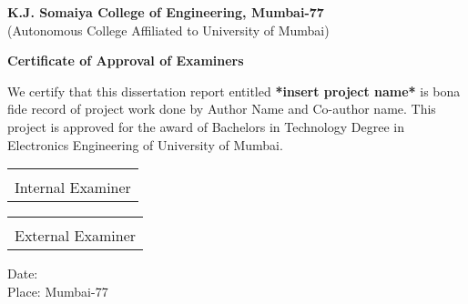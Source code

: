 \newpage
    \begin{center}
    
        \vspace*{0.1cm}
        \large
        \textbf{K.J. Somaiya College of Engineering, Mumbai-77}\\
        \normalsize
        (Autonomous College Affiliated to University of Mumbai)\\
        
        \vspace{0.8cm}
        
        \large
        \textbf{Certificate of Approval of Examiners}\\
        \vspace{0.5cm}
        
    \end{center}

\noindent
{\large We certify that this dissertation report entitled \textbf{*insert project name*} is bona fide record of project work done by Author Name and Co-author name. This project is approved for the award of Bachelors in Technology Degree in Electronics Engineering of University of Mumbai.} 
\vspace{2cm}

\begin{table}[h]
\centering
\begin{tabular}{Y}
\hrulefill\\
\large Internal Examiner\\
\end{tabular}
\end{table}

\vspace{2cm}

\begin{table}[h]
\centering
\begin{tabular}{Y}
\hrulefill\\
\large External Examiner
\end{tabular}
\end{table}

\vspace{1cm}
\noindent
{\large Date:}\\
{\large Place: Mumbai-77}